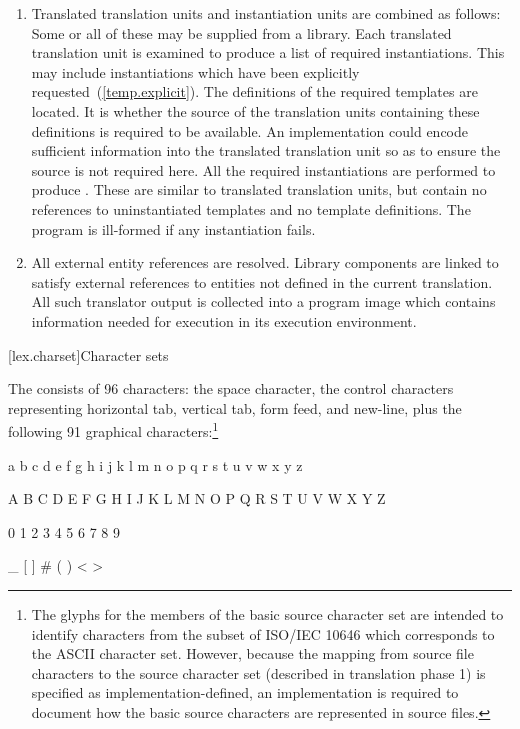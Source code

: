 \begin{enumerate}
\item Translated translation units and instantiation units are combined
as follows: \enternote Some or all of these may be supplied from a
library. \exitnote Each translated translation unit is examined to
produce a list of required instantiations. \enternote This may include
instantiations which have been explicitly
requested~(\ref{temp.explicit}). \exitnote The definitions of the
required templates are located. It is  whether the
source of the translation units containing these definitions is required
to be available. \enternote An implementation could encode sufficient
information into the translated translation unit so as to ensure the
source is not required here. \exitnote All the required instantiations
are performed to produce
. \enternote These are similar
to translated translation units, but contain no references to
uninstantiated templates and no template definitions. \exitnote The
program is ill-formed if any instantiation fails.

\item All external entity references are resolved. Library
components are linked to satisfy external references to
entities not defined in the current translation. All such translator
output is collected into a program image which contains information
needed for execution in its execution environment.%
\end{enumerate}

[lex.charset]{Character sets}

\pnum
{}%
%
The  consists of 96 characters: the space character,
the control characters representing horizontal tab, vertical tab, form feed, and
new-line, plus the following 91 graphical characters:\footnote{The glyphs for
the members of the basic source character set are intended to
identify characters from the subset of ISO/IEC 10646 which corresponds to the ASCII
character set. However, because the mapping from source file characters to the source
character set (described in translation phase 1) is specified as implementation-defined,
an implementation is required to document how the basic source characters are
represented in source files.}

\begin{codeblock}
a b c d e f g h i j k l m n o p q r s t u v w x y z

A B C D E F G H I J K L M N O P Q R S T U V W X Y Z

0 1 2 3 4 5 6 7 8 9

_ { } [ ] # ( ) < > %
\end{codeblock}

